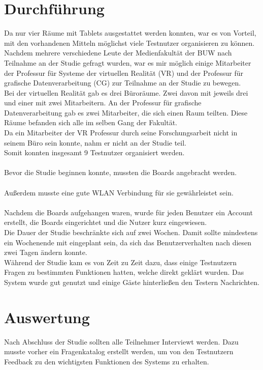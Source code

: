 \section{Durchführung}\label{Durchführung}
Da nur vier Räume mit Tablets ausgestattet werden konnten, war es von Vorteil, mit den vorhandenen Mitteln möglichst viele Testnutzer organisieren zu können.
Nachdem mehrere verschiedene Leute der Medienfakultät der BUW nach Teilnahme an der Studie gefragt wurden, war es mir möglich einige Mitarbeiter der Professur für Systeme der virtuellen Realität (VR) und der Professur für grafische Datenverarbeitung (CG) zur Teilnahme an der Studie zu bewegen.
\\
Bei der virtuellen Realität gab es drei Büroräume.
Zwei davon mit jeweils drei und einer mit zwei Mitarbeitern.
An der Professur für grafische Datenverarbeitung gab es zwei Mitarbeiter, die sich einen Raum teilten.
Diese Räume befanden sich alle im selben Gang der Fakultät.
\\
Da ein Mitarbeiter der VR Professur durch seine Forschungsarbeit nicht in seinem Büro sein konnte, nahm er nicht an der Studie teil.
\\
Somit konnten insgesamt 9  Testnutzer organisiert werden.
\\
\\
Bevor die Studie beginnen konnte, mussten die Boards angebracht werden.
\\\\
Außerdem musste eine gute WLAN Verbindung für sie gewährleistet sein.
\\\\
Nachdem die Boards aufgehangen waren, wurde für jeden Benutzer ein Account erstellt, die Boards eingerichtet und die Nutzer kurz eingewiesen.
\\
Die Dauer der Studie beschränkte sich auf zwei Wochen.
Damit sollte mindestens ein Wochenende mit eingeplant sein, da sich das Benutzerverhalten nach diesen zwei Tagen ändern konnte.
\\
Während der Studie kam es von Zeit zu Zeit dazu, dass einige Testnutzern Fragen zu bestimmten Funktionen hatten, welche direkt geklärt wurden.
Das System wurde gut genutzt und einige Gäste hinterließen den Testern Nachrichten.



\section{Auswertung}\label{Auswertung}
Nach Abschluss der Studie sollten alle Teilnehmer Interviewt werden.
Dazu musste vorher ein Fragenkatalog erstellt werden, um von den Testnutzern Feedback zu den wichtigsten Funktionen des Systems zu erhalten.
\\
